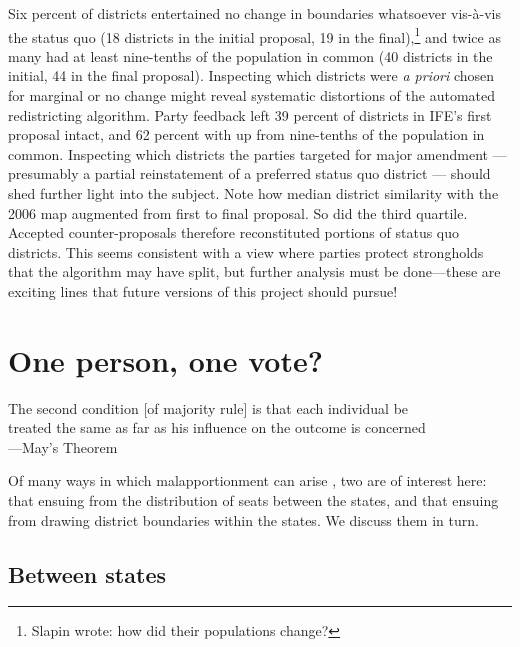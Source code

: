 \documentclass[letter,12pt]{article}
\begin{document}
Six percent of districts entertained no change in boundaries whatsoever vis-\`a-vis the status quo (18 districts in the initial proposal, 19 in the final),\footnote{Slapin wrote: how did their populations change?} and twice as many had at least nine-tenths of the population in common (40 districts in the initial, 44 in the final proposal). Inspecting which districts were \emph{a priori} chosen for marginal or no change might reveal systematic distortions of the automated redistricting algorithm. Party feedback left 39 percent of districts in IFE's first proposal intact, and 62 percent with up from nine-tenths of the population in common. Inspecting which districts the parties targeted for major amendment --- presumably a partial reinstatement of a preferred status quo district --- should shed further light into the subject. Note how median district similarity with the 2006 map augmented from first to final proposal. So did the third quartile. Accepted counter-proposals therefore reconstituted portions of status quo districts. This seems consistent with a view where parties protect strongholds that the algorithm may have split, but further analysis must be done---these are exciting lines that future versions of this project should pursue!

\section{One person, one vote?}

\singlespacing
\begin{center}
The second condition [of majority rule] is that each individual be \\ treated the same as far as his influence on the outcome is concerned \\ ---May's Theorem
\end{center}

\onehalfspacing





Of many ways in which malapportionment can arise \citep{snyder.samuelsMalapp2004}, two are of interest here: that ensuing from the distribution of seats between the states, and that ensuing from drawing district boundaries within the states. We discuss them in turn.

\subsection{Between states}
\end{document}
